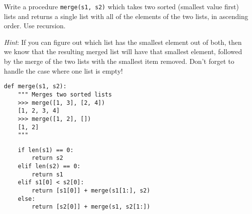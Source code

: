 \question Write a procedure {\tt merge(s1, s2)} which takes two sorted (smallest
value first) lists and returns a single list with all of the elements of the two
lists, in ascending order. Use recursion.

{\it Hint}: If you can figure out which list has the smallest element out of
both, then we know that the resulting merged list will have that smallest
element, followed by the merge of the two lists with the smallest item
removed. Don't forget to handle the case where one list is empty!

\begin{lstlisting}
def merge(s1, s2):
    """ Merges two sorted lists
    >>> merge([1, 3], [2, 4])
    [1, 2, 3, 4]
    >>> merge([1, 2], [])
    [1, 2]
    """
\end{lstlisting}
\begin{solution}[1.5in]
\begin{lstlisting}
    if len(s1) == 0:
        return s2
    elif len(s2) == 0:
        return s1
    elif s1[0] < s2[0]:
        return [s1[0]] + merge(s1[1:], s2)
    else:
        return [s2[0]] + merge(s1, s2[1:])
\end{lstlisting}
\end{solution}
